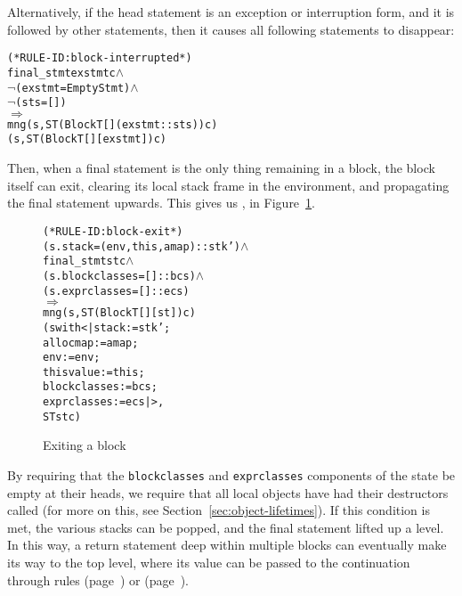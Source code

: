 \documentclass[11pt]{article}
\begin{document}
Alternatively, if the head statement is an exception or interruption
form, and it is followed by other statements, then it causes all
following statements to disappear:
\begin{center}
\begin{minipage}{\textwidth}
\begin{alltt}
(* RULE-ID: block-interrupted *)
     final_stmt exstmt c \(\land\)
     \(\neg\)(exstmt = EmptyStmt) \(\land\)
     \(\neg\)(sts = [])
   \(\Rightarrow\)
     mng (s, ST (Block T [] (exstmt::sts)) c)
         (s, ST (Block T [] [exstmt]) c)
\end{alltt}
\end{minipage}
\end{center}

Then, when a final statement is the only thing remaining in a block,
the block itself can exit, clearing its local stack frame in the
environment, and propagating the final statement upwards.  This gives
us , in Figure~\ref{fig:block-exit}.
\begin{figure}
\begin{center}
\begin{minipage}{\textwidth}
\begin{alltt}
(* RULE-ID: block-exit *)
     (s.stack = (env,this,amap) :: stk') \(\land\)
     final_stmt st c \(\land\)
     (s.blockclasses = []::bcs) \(\land\)
     (s.exprclasses = []::ecs)
   \(\Rightarrow\)
     mng (s, ST (Block T [] [st]) c)
         (s with <| stack := stk';
                    allocmap := amap;
                    env := env;
                    thisvalue := this;
                    blockclasses := bcs;
                    exprclasses := ecs |>,
          ST st c)
\end{alltt}
\end{minipage}
\end{center}
\caption{Exiting a block}
\label{fig:block-exit}
\end{figure}
%
By requiring that the \texttt{blockclasses} and \texttt{exprclasses}
components of the state be empty at their heads, we require that all
local objects have had their destructors called (for more on this, see
Section~\ref{sec:object-lifetimes}).  If this condition is met, the
various stacks can be popped, and the final statement lifted up a
level.  In this way, a return statement deep within multiple blocks
can eventually make its way to the top level, where its value can be
passed to the continuation through rules 
(page~\pageref{rule:return-rvalue}) or 
(page~\pageref{rule:return-lvalue}).
\end{document}
